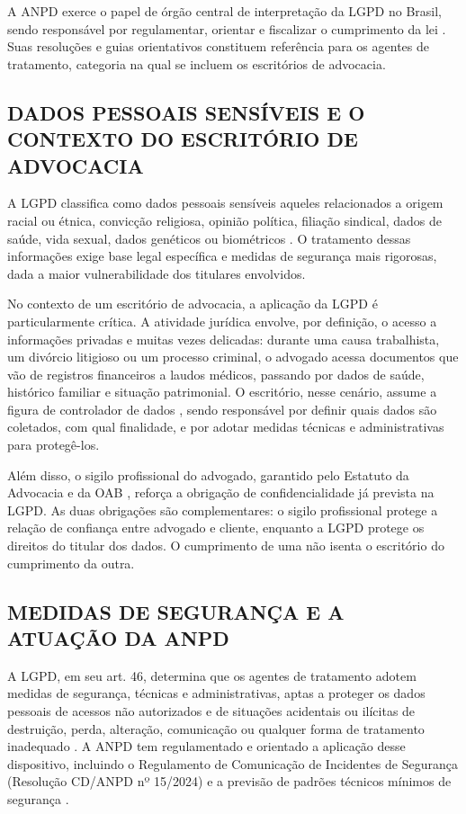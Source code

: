 A ANPD exerce o papel de órgão central de interpretação da LGPD no Brasil, sendo responsável por regulamentar, orientar e fiscalizar o cumprimento da lei . Suas resoluções e guias orientativos constituem referência para os agentes de tratamento, categoria na qual se incluem os escritórios de advocacia.

\subsection{DADOS PESSOAIS SENSÍVEIS E O CONTEXTO DO ESCRITÓRIO DE ADVOCACIA}
A LGPD classifica como dados pessoais sensíveis aqueles relacionados a origem racial ou étnica, convicção religiosa, opinião política, filiação sindical, dados de saúde, vida sexual, dados genéticos ou biométricos . O tratamento dessas informações exige base legal específica e medidas de segurança mais rigorosas, dada a maior vulnerabilidade dos titulares envolvidos.

No contexto de um escritório de advocacia, a aplicação da LGPD é particularmente crítica. A atividade jurídica envolve, por definição, o acesso a informações privadas e muitas vezes delicadas: durante uma causa trabalhista, um divórcio litigioso ou um processo criminal, o advogado acessa documentos que vão de registros financeiros a laudos médicos, passando por dados de saúde, histórico familiar e situação patrimonial. O escritório, nesse cenário, assume a figura de controlador de dados , sendo responsável por definir quais dados são coletados, com qual finalidade, e por adotar medidas técnicas e administrativas para protegê-los.

Além disso, o sigilo profissional do advogado, garantido pelo Estatuto da Advocacia e da OAB , reforça a obrigação de confidencialidade já prevista na LGPD. As duas obrigações são complementares: o sigilo profissional protege a relação de confiança entre advogado e cliente, enquanto a LGPD protege os direitos do titular dos dados. O cumprimento de uma não isenta o escritório do cumprimento da outra.

\subsection{MEDIDAS DE SEGURANÇA E A ATUAÇÃO DA ANPD}
A LGPD, em seu art. 46, determina que os agentes de tratamento adotem medidas de segurança, técnicas e administrativas, aptas a proteger os dados pessoais de acessos não autorizados e de situações acidentais ou ilícitas de destruição, perda, alteração, comunicação ou qualquer forma de tratamento inadequado . A ANPD tem regulamentado e orientado a aplicação desse dispositivo, incluindo o Regulamento de Comunicação de Incidentes de Segurança (Resolução CD/ANPD nº 15/2024) e a previsão de padrões técnicos mínimos de segurança .

